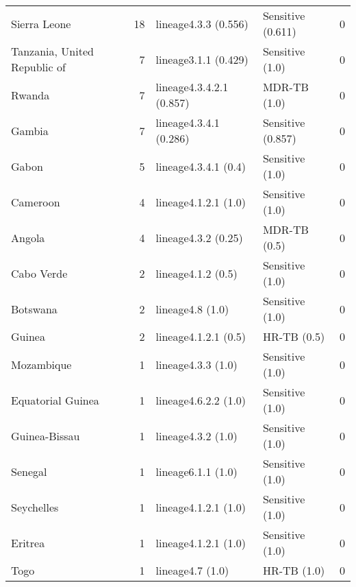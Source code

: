 \begin{tabular}{lrllr}
 Sierra Leone                                 &            18 & lineage4.3.3 (0.556)     & Sensitive (0.611)   &      0     \\
 Tanzania, United Republic of                 &             7 & lineage3.1.1 (0.429)     & Sensitive (1.0)     &      0     \\
 Rwanda                                       &             7 & lineage4.3.4.2.1 (0.857) & MDR-TB (1.0)        &      0     \\
 Gambia                                       &             7 & lineage4.3.4.1 (0.286)   & Sensitive (0.857)   &      0     \\
 Gabon                                        &             5 & lineage4.3.4.1 (0.4)     & Sensitive (1.0)     &      0     \\
 Cameroon                                     &             4 & lineage4.1.2.1 (1.0)     & Sensitive (1.0)     &      0     \\
 Angola                                       &             4 & lineage4.3.2 (0.25)      & MDR-TB (0.5)        &      0     \\
 Cabo Verde                                   &             2 & lineage4.1.2 (0.5)       & Sensitive (1.0)     &      0     \\
 Botswana                                     &             2 & lineage4.8 (1.0)         & Sensitive (1.0)     &      0     \\
 Guinea                                       &             2 & lineage4.1.2.1 (0.5)     & HR-TB (0.5)         &      0     \\
 Mozambique                                   &             1 & lineage4.3.3 (1.0)       & Sensitive (1.0)     &      0     \\
 Equatorial Guinea                            &             1 & lineage4.6.2.2 (1.0)     & Sensitive (1.0)     &      0     \\
 Guinea-Bissau                                &             1 & lineage4.3.2 (1.0)       & Sensitive (1.0)     &      0     \\
 Senegal                                      &             1 & lineage6.1.1 (1.0)       & Sensitive (1.0)     &      0     \\
 Seychelles                                   &             1 & lineage4.1.2.1 (1.0)     & Sensitive (1.0)     &      0     \\
 Eritrea                                      &             1 & lineage4.1.2.1 (1.0)     & Sensitive (1.0)     &      0     \\
 Togo                                         &             1 & lineage4.7 (1.0)         & HR-TB (1.0)         &      0     \\
 \hline


\end{tabular}
